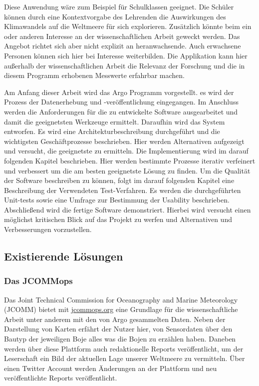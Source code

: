    
    Diese Anwendung wäre zum Beispiel für Schulklassen geeignet. Die Schüler können durch eine Kontextvorgabe des Lehrenden  die Auswirkungen des Klimawandels auf die Weltmeere für sich explorieren. Zusätzlich könnte beim ein oder anderen Interesse an der wissenschaftlichen Arbeit geweckt werden.
    Das Angebot richtet sich aber nicht explizit an heranwachsende. Auch erwachsene Personen können sich hier bei Interesse weiterbilden. Die Applikation kann hier außerhalb der wissenschaftlichen Arbeit die Relevanz der Forschung und die in diesem Programm erhobenen Messwerte  erfahrbar machen. 
    
    Am Anfang dieser Arbeit wird das Argo Programm vorgestellt. es wird der Prozess der Datenerhebung und -veröffentlichung eingegangen. 
    Im Anschluss werden die Anforderungen für die zu entwickelte Software ausgearbeitet und damit die geeignetsten Werkzeuge ermittelt.
    Daraufhin wird das System entworfen. Es wird eine Architekturbeschreibung durchgeführt und die wichtigsten Geschäftprozesse beschrieben. Hier werden Alternativen aufgezeigt und versucht, die geeignetste zu ermitteln.
    Die Implementierung wird im darauf folgenden Kapitel beschrieben. Hier werden bestimmte Prozesse iterativ verfeinert und verbessert um die am besten geeignetste Lösung zu finden. 
    Um die Qualität der Software beschreiben zu können, folgt im darauf folgenden Kapitel eine Beschreibung der Verwendeten Test-Verfahren. Es werden die durchgeführten Unit-tests sowie eine Umfrage zur Bestimmung der Usability beschrieben.    
    Abschließend wird die fertige Software demonstriert. Hierbei wird versucht einen möglichst kritischen Blick auf das Projekt zu werfen und Alternativen und Verbesserungen vorzustellen.
    
    
    
\subsection{Existierende Lösungen}
  
\subsubsection{Das JCOMMops} 
   
   Das Joint Technical Commission for Oceanography and Marine Meteorology (JCOMM) bietet mit 
    \url{jcommops.org} eine Grundlage für die wissenschaftliche Arbeit unter anderem mit den von Argo gesammelten Daten. Neben der Darstellung von Karten erfährt der Nutzer hier, von Sensordaten über den Bautyp der jeweiligen Boje alles was die Bojen zu erzählen haben. Daneben werden über diese Plattform auch redaktionelle Reports veröffentlicht, um der Leserschaft ein Bild der aktuellen Lage unserer Weltmeere zu vermitteln. Über einen Twitter Account werden Änderungen an der Plattform und neu veröffentlichte Reports veröffentlicht. 
    

